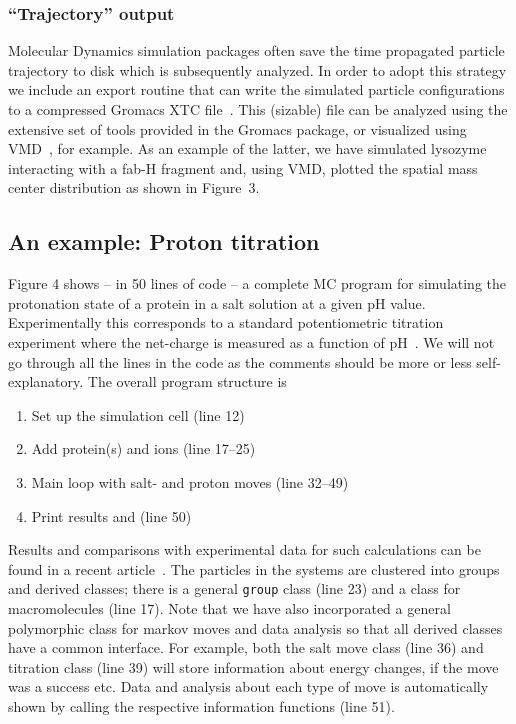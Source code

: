 \documentclass[10pt]{bmc_article}
\newenvironment{bmcformat}{\begin{raggedright}\baselineskip20pt\sloppy\setboolean{publ}{false}}{\end{raggedright}\baselineskip20pt\sloppy}
\begin{document}
\begin{bmcformat}
\subsubsection*{``Trajectory'' output}
Molecular Dynamics simulation packages often save the time propagated particle trajectory to disk which is subsequently analyzed.
In order to adopt this strategy we include an export routine that can write the simulated particle configurations to a compressed Gromacs XTC file~\cite{gromacs}.
This (sizable) file can be analyzed using the extensive set of tools provided in the Gromacs package, or visualized using VMD~\cite{vmd}, for example.
As an example of the latter, we have simulated lysozyme interacting with a fab-H fragment and, using VMD, plotted the spatial mass center distribution as shown in Figure~3.



\subsection*{An example: Proton titration}
Figure 4 shows -- in 50 lines of code -- a complete MC program for simulating the protonation state of a protein in a salt solution at a given pH value.
Experimentally this corresponds to a standard potentiometric titration experiment where the net-charge is measured as a function of pH~\cite{tanford:72}.
We will not go through all the lines in the code as the comments should be more or less self-explanatory.
The overall program structure is
\begin{enumerate}
\item Set up the simulation cell (line 12)
\item Add protein(s) and ions (line 17--25)
\item Main loop with salt- and proton moves (line 32--49)
\item Print results and (line 50)
\end{enumerate}
Results and comparisons with experimental data for such calculations can be found in a recent article~\cite{lund:07}.
The particles in the systems are clustered into groups and derived classes; there is a general \verb"group" class (line 23) and a class for macromolecules (line 17).
Note that we have also incorporated a general polymorphic class for markov moves and data analysis so that all derived classes have a common interface.
For example, both the salt move class (line 36) and titration class (line 39) will store information about energy changes, if the move was a success etc.
Data and analysis about each type of move is automatically shown by calling the respective information functions (line 51).


\end{bmcformat}
\end{document}
